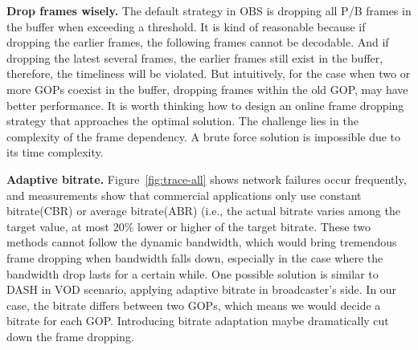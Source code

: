 \textbf{Drop frames wisely.} The default strategy in OBS is dropping all P/B frames in the buffer when exceeding a threshold. It is kind of reasonable because if dropping the earlier frames, the following frames cannot be decodable. And if dropping the latest several frames, the earlier frames still exist in the buffer, therefore, the timeliness will be violated. But intuitively, for the case when two or more GOPs coexist in the buffer, dropping frames within the old GOP, may have better performance. It is worth thinking how to design an online frame dropping strategy that approaches the optimal solution. The challenge lies in the complexity of the frame dependency. A brute force solution is impossible due to its time complexity.

\textbf{Adaptive bitrate.} Figure~\ref{fig:trace-all} shows network failures occur frequently, and measurements show that commercial applications only use constant bitrate(CBR) or average bitrate(ABR) (i.e., the actual bitrate varies among the target value, at most $20\%$ lower or higher of the target bitrate. These two methods cannot follow the dynamic bandwidth, which would bring tremendous frame dropping when bandwidth falls down, especially in the case where the bandwidth drop lasts for a certain while. One possible solution is similar to DASH in VOD scenario, applying adaptive bitrate in broadcaster's side. In our case, the bitrate differs between two GOPs, which means we would decide a bitrate for each GOP. Introducing bitrate adaptation maybe dramatically cut down the frame dropping.


